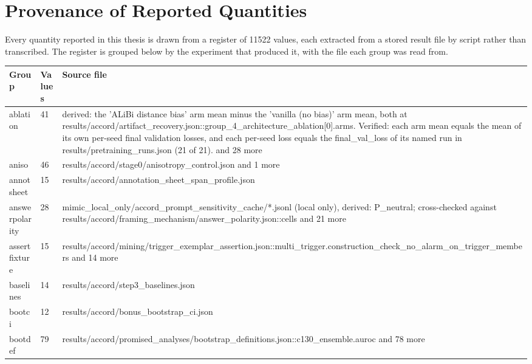 \chapter{Provenance of Reported Quantities}
\label{app:provenance}

Every quantity reported in this thesis is drawn from a register of 11522 values, each
extracted from a stored result file by script rather than transcribed. The register is
grouped below by the experiment that produced it, with the file each group was read from.

\singlespacing
\renewcommand{\arraystretch}{0.9}
\footnotesize
\begin{longtable}{@{}p{1.6in}p{0.6in}p{3.6in}@{}}
\textbf{Group} & \textbf{Values} & \textbf{Source file}\\
\midrule
\endhead
ablation & 41 & derived: the 'ALiBi distance bias' arm mean minus the 'vanilla (no bias)' arm mean, both at results/\allowbreak{}accord/\allowbreak{}artifact\_recovery.\allowbreak{}json::group\_4\_architecture\_ablation[0].\allowbreak{}arms.\allowbreak{} Verified: each arm mean equals the mean of its own per-seed final validation losses, and each per-seed loss equals the final\_val\_loss of its named run in results/\allowbreak{}pretraining\_runs.\allowbreak{}json (21 of 21).\allowbreak{} and 28 more\\
aniso & 46 & results/\allowbreak{}accord/\allowbreak{}stage0/\allowbreak{}anisotropy\_control.\allowbreak{}json and 1 more\\
annotsheet & 15 & results/\allowbreak{}accord/\allowbreak{}annotation\_sheet\_span\_profile.\allowbreak{}json\\
answerpolarity & 28 & mimic\_local\_only/\allowbreak{}accord\_prompt\_sensitivity\_cache/\allowbreak{}*.\allowbreak{}jsonl (local only), derived: P\_neutral; cross-checked against results/\allowbreak{}accord/\allowbreak{}framing\_mechanism/\allowbreak{}answer\_polarity.\allowbreak{}json::cells and 21 more\\
assertfixture & 15 & results/\allowbreak{}accord/\allowbreak{}mining/\allowbreak{}trigger\_exemplar\_assertion.\allowbreak{}json::multi\_trigger.\allowbreak{}construction\_check\_no\_alarm\_on\_trigger\_members and 14 more\\
baselines & 14 & results/\allowbreak{}accord/\allowbreak{}step3\_baselines.\allowbreak{}json\\
bootci & 12 & results/\allowbreak{}accord/\allowbreak{}bonus\_bootstrap\_ci.\allowbreak{}json\\
bootdef & 79 & results/\allowbreak{}accord/\allowbreak{}promised\_analyses/\allowbreak{}bootstrap\_definitions.\allowbreak{}json::c130\_ensemble.\allowbreak{}auroc and 78 more\\

\end{longtable}
